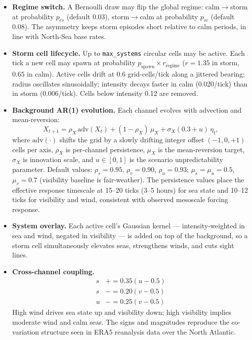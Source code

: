 \documentclass[cameraready]{Interspeech}
\begin{document}
\begin{itemize}[leftmargin=*, itemsep=2pt]
    \item \textbf{Regime switch.} A Bernoulli draw may flip the global regime: calm$\to$storm at probability $p_{cs}$ (default 0.03), storm$\to$calm at probability $p_{sc}$ (default 0.08). The asymmetry keeps storm episodes short relative to calm periods, in line with North-Sea base rates.

    \item \textbf{Storm cell lifecycle.} Up to \texttt{max\_systems} circular cells may be active. Each tick a new cell may spawn at probability $p_\text{spawn}\times r_\text{regime}$ ($r=1.35$ in storm, $0.65$ in calm). Active cells drift at 0.6 grid-cells/tick along a jittered bearing; radius oscillates sinusoidally; intensity decays faster in calm (0.020/tick) than in storm (0.006/tick). Cells below intensity 0.12 are removed.

    \item \textbf{Background AR(1) evolution.} Each channel evolves with advection and mean-reversion:
    \begin{equation}
      X_{t+1} = \rho_X\,\mathrm{adv}(X_t)
                 + (1-\rho_X)\,\mu_X
                 + \sigma_X(0.3+u)\,\eta_t,
      \label{eq:ar1}
    \end{equation}
    where $\mathrm{adv}(\cdot)$ shifts the grid by a slowly drifting integer offset $(-1,0,{+}1)$ cells per axis, $\rho_X$ is per-channel persistence, $\mu_X$ is the mean-reversion target, $\sigma_X$ is innovation scale, and $u\in[0,1]$ is the scenario unpredictability parameter. Default values: $\rho_s{=}0.95$, $\rho_v{=}0.90$, $\rho_u{=}0.93$; $\mu_s{=}\mu_u{=}0.5$, $\mu_v{=}0.7$ (visibility baseline is fair-weather). The persistence values place the effective response timescale at 15--20 ticks (3--5 hours) for sea state and 10--12 ticks for visibility and wind, consistent with observed mesoscale forcing response.

    \item \textbf{System overlay.} Each active cell's Gaussian kernel — intensity-weighted in sea and wind, negated in visibility — is added on top of the background, so a storm cell simultaneously elevates seas, strengthens winds, and cuts sight lines.

    \item \textbf{Cross-channel coupling.}
    \begin{align}
      s &\mathrel{+}= 0.35(u-0.5) \\
      s &\mathrel{-}= 0.20(v-0.5) \\
      u &\mathrel{-}= 0.25(v-0.5)
      \label{eq:coupling}
    \end{align}
    High wind drives sea state up and visibility down; high visibility implies moderate wind and calm seas. The signs and magnitudes reproduce the co-variation structure seen in ERA5 reanalysis data over the North Atlantic.


\end{itemize}
\end{document}
